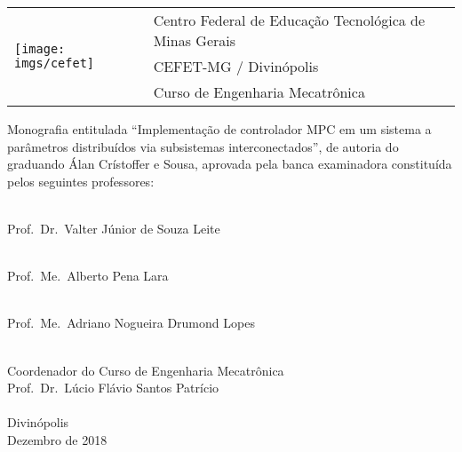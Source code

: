 \cleardoublepage{}


\begin{table}[]
    \begin{tabular}{ll}
    \multirow{3}{*}{\texttt{[image: imgs/cefet]}} & Centro Federal de Educação Tecnológica de Minas Gerais \\
                                                             & CEFET-MG / Divinópolis                                 \\
                                                             & Curso de Engenharia Mecatrônica                       
    \end{tabular}
\end{table}

\vspace*{2.0cm}

Monografia entitulada \enquote{Implementação de controlador MPC em um sistema
a parâmetros distribuídos via subsistemas interconectados}, de autoria do
graduando Álan Crístoffer e Sousa, aprovada pela banca examinadora constituída
pelos seguintes professores:

\vspace*{1cm}

\begin{center}
    \hrulefill{}\\
    Prof.\ Dr.\ Valter Júnior de Souza Leite

    \vspace*{1cm}

    \hrulefill{}\\
    Prof.\ Me.\ Alberto Pena Lara

    \vspace*{1cm}

    \hrulefill{}\\
    Prof.\ Me.\ Adriano Nogueira Drumond Lopes

    \vspace*{4cm}

    \hrulefill{}\\
    Coordenador do Curso de Engenharia Mecatrônica\\
    Prof.\ Dr.\ Lúcio Flávio Santos Patrício\\
~\\
    Divinópolis\\
    Dezembro de 2018
\end{center}

\vfill{}
\cleardoublepage{}

